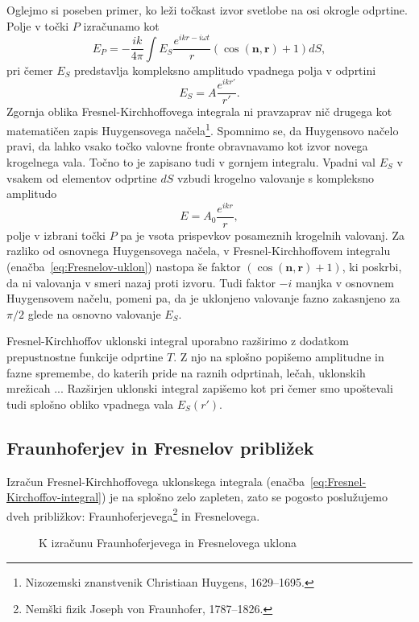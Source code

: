 Oglejmo si poseben primer, ko leži točkast izvor svetlobe na osi okrogle odprtine. Polje 
v točki $P$ izračunamo kot 
\begin{equation}
\label{eq:Fresnelov-uklon}
E_P =  -\frac{ik}{4\pi} \int E_S\frac{ e^{ikr-i\omega t}}{r}\left(\cos(\mathbf{n},\mathbf{r})+1\right) dS,
\end{equation}
pri čemer $E_S$ predstavlja kompleksno amplitudo vpadnega polja v odprtini
\begin{equation}
E_S = A \frac{e^{ikr'}}{r'}.
\end{equation} 
Zgornja oblika Fresnel-Kirchhoffovega integrala ni pravzaprav nič drugega kot 
matematičen zapis Huygensovega 
načela\footnote{Nizozemski znanstvenik Christiaan Huygens, 1629--1695.}. 
Spomnimo se, da Huygensovo načelo pravi, da lahko vsako točko valovne fronte obravnavamo 
kot izvor novega krogelnega vala. Točno to je zapisano tudi v gornjem integralu. Vpadni val
$E_S$ v vsakem od elementov odprtine $dS$ vzbudi krogelno valovanje s
kompleksno amplitudo
\begin{equation}
E = A_0 \frac{e^{ikr}}{r},
\end{equation} 
polje v izbrani točki $P$ pa je vsota prispevkov posameznih krogelnih valovanj.
Za razliko od osnovnega Huygensovega načela, v Fresnel-Kirchhoffovem integralu 
(enačba~\ref{eq:Fresnelov-uklon})
nastopa še faktor $\left(\cos(\mathbf{n},\mathbf{r})+1\right)$, ki poskrbi, da ni valovanja 
v smeri nazaj proti izvoru. Tudi faktor $-i$ manjka v osnovnem Huygensovem načelu,
pomeni pa, da je uklonjeno valovanje fazno zakasnjeno za $\pi/2$ glede na osnovno
valovanje $E_S$.

Fresnel-Kirchhoffov uklonski integral uporabno razširimo z dodatkom prepustnostne funkcije odprtine $T$.
Z njo na splošno popišemo amplitudne in fazne spremembe, do katerih pride na raznih 
odprtinah, lečah, uklonskih mrežicah ... Razširjen uklonski integral zapišemo kot
pri čemer smo upoštevali tudi splošno obliko vpadnega vala $E_S(r')$.

\subsection*{Fraunhoferjev in Fresnelov približek}
\label{FFuklon}
Izračun Fresnel-Kirchhoffovega uklonskega integrala (enačba~\ref{eq:Fresnel-Kirchoffov-integral}) 
je na splošno zelo zapleten, zato se 
pogosto poslužujemo dveh približkov: Fraunhoferjevega\footnote{Nemški fizik 
Joseph von Fraunhofer, 1787--1826.} in Fresnelovega. 
\begin{figure}[!h]
\centering {} 
  
\caption{K izračunu Fraunhoferjevega in Fresnelovega uklona}
\label{fig:Uklon-koordinate}
\end{figure}

